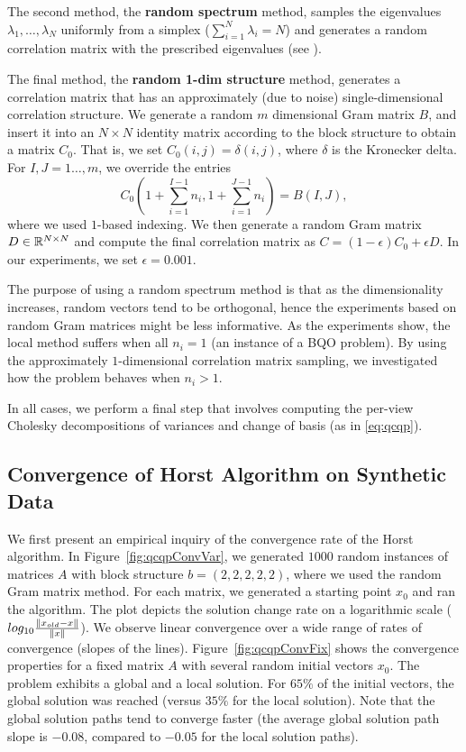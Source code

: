 The second method, the \textbf{random spectrum} method,
samples the eigenvalues $\lambda_1,\ldots,\lambda_N$ uniformly
from a simplex ($\sum_{i=1}^{N} \lambda_i = N$) and generates a
random correlation matrix with the prescribed eigenvalues (see
\cite{Bendel_Mickey_78}).

The final method, the \textbf{random 1-dim structure} method,
generates a correlation matrix that has an approximately (due to
noise) single-dimensional correlation structure. We
generate a random $m$ dimensional Gram matrix $B$, and insert
it into an $N\times N$ identity matrix according to the block
structure to obtain a matrix $C_0$. That is, we set $C_0\left(i,j\right) = \delta\left(i,j\right)$,
where $\delta$ is the Kronecker delta. For $I,J = 1\ldots,m$, we
override the entries $$C_0\left(1+ \sum_{i=1}^{I-1}n_i, 1+
\sum_{i=1}^{J-1}n_i\right) = B\left(I,J\right),$$ where we used $1$-based
indexing. We then generate a random Gram matrix $D \in
\mathbb{R}^{N\times N}$ and compute the final correlation matrix as $C
= \left(1- \epsilon\right)C_0 + \epsilon D$.
In our experiments, we set $\epsilon = 0.001$.

The purpose of using a random spectrum method
is that as the dimensionality increases, random vectors tend to
be orthogonal, hence the experiments based on random Gram
matrices might be less informative. As the experiments show, the
local method suffers  when all $n_i = 1$ (an instance of a BQO problem). 
By using the approximately $1$-dimensional correlation matrix sampling, 
we investigated how the problem behaves when $n_i > 1$.

In all cases, we perform a final step that involves computing the
per-view Cholesky decompositions of variances and change of basis
(as in \ref{eq:qcqp}).

\subsection{Convergence of Horst Algorithm on Synthetic Data}\label{chap:experiments:horst}

We first present an empirical inquiry of the convergence rate of the
Horst algorithm. In Figure~\ref{fig:qcqpConvVar}, we
generated $1000$ random  instances of matrices $A$ with block
structure $b = \left(2,2,2,2,2\right)$, where we used 
the random Gram matrix method. For each matrix, we generated
a starting point $x_0$ and ran the algorithm. The plot depicts the
solution change rate on a logarithmic scale ($log_{10}
\frac{\lVert x_{old} - x\rVert}{\lVert x\rVert}$). We observe linear convergence
over a wide range of rates of convergence (slopes of the
lines). Figure~\ref{fig:qcqpConvFix} shows the convergence properties
for a fixed matrix $A$ with several random initial vectors $x_0$. The
problem exhibits a global and a local solution. For $65\%$ of the initial vectors, 
the global solution was reached (versus $35\%$ for the local solution). Note that the global
solution paths tend to converge faster (the average global solution path slope 
is  $-0.08$, compared  to $-0.05$ for the local solution paths).

